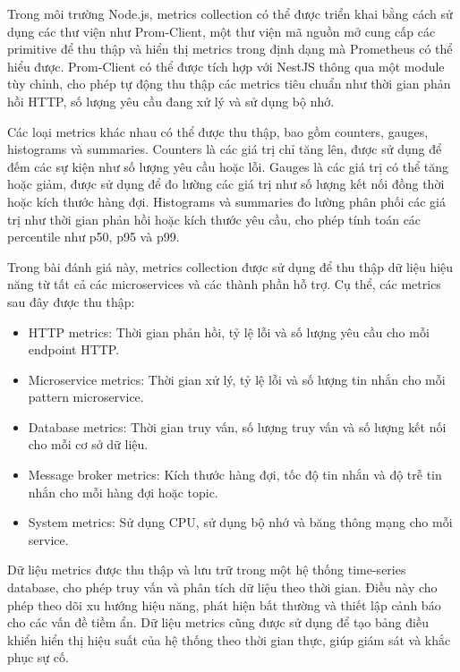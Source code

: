 Trong môi trường Node.js, metrics collection có thể được triển khai bằng cách sử dụng các thư viện như Prom-Client, một thư viện mã nguồn mở cung cấp các primitive để thu thập và hiển thị metrics trong định dạng mà Prometheus có thể hiểu được. Prom-Client có thể được tích hợp với NestJS thông qua một module tùy chỉnh, cho phép tự động thu thập các metrics tiêu chuẩn như thời gian phản hồi HTTP, số lượng yêu cầu đang xử lý và sử dụng bộ nhớ.

Các loại metrics khác nhau có thể được thu thập, bao gồm counters, gauges, histograms và summaries. Counters là các giá trị chỉ tăng lên, được sử dụng để đếm các sự kiện như số lượng yêu cầu hoặc lỗi. Gauges là các giá trị có thể tăng hoặc giảm, được sử dụng để đo lường các giá trị như số lượng kết nối đồng thời hoặc kích thước hàng đợi. Histograms và summaries đo lường phân phối các giá trị như thời gian phản hồi hoặc kích thước yêu cầu, cho phép tính toán các percentile như p50, p95 và p99.

Trong bài đánh giá này, metrics collection được sử dụng để thu thập dữ liệu hiệu năng từ tất cả các microservices và các thành phần hỗ trợ. Cụ thể, các metrics sau đây được thu thập:

\begin{itemize}
    \item HTTP metrics: Thời gian phản hồi, tỷ lệ lỗi và số lượng yêu cầu cho mỗi endpoint HTTP.
    \item Microservice metrics: Thời gian xử lý, tỷ lệ lỗi và số lượng tin nhắn cho mỗi pattern microservice.
    \item Database metrics: Thời gian truy vấn, số lượng truy vấn và số lượng kết nối cho mỗi cơ sở dữ liệu.
    \item Message broker metrics: Kích thước hàng đợi, tốc độ tin nhắn và độ trễ tin nhắn cho mỗi hàng đợi hoặc topic.
    \item System metrics: Sử dụng CPU, sử dụng bộ nhớ và băng thông mạng cho mỗi service.
\end{itemize}

Dữ liệu metrics được thu thập và lưu trữ trong một hệ thống time-series database, cho phép truy vấn và phân tích dữ liệu theo thời gian. Điều này cho phép theo dõi xu hướng hiệu năng, phát hiện bất thường và thiết lập cảnh báo cho các vấn đề tiềm ẩn. Dữ liệu metrics cũng được sử dụng để tạo bảng điều khiển hiển thị hiệu suất của hệ thống theo thời gian thực, giúp giám sát và khắc phục sự cố.

